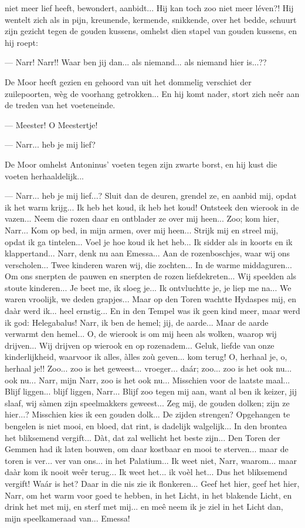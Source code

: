 \documentclass[a4paper, 12pt, oneside, dutch]{article}
\begin{document}
niet meer lief heeft, bewondert, aanbidt... Hij kan toch zoo niet meer léven?! Hij wentelt zich als in pijn, kreunende, kermende, snikkende, over het bedde, schuurt zijn gezicht tegen de gouden kussens, omhelst dien stapel van gouden kussens, en hij roept:

--- Narr! Narr!! Waar ben jij dan... als niemand... als niemand hier is...??

De Moor heeft gezien en gehoord van uit het dommelig verschiet der zuilepoorten, wèg de voorhang getrokken... En hij komt nader, stort zich neêr aan de treden van het voeteneinde.

--- Meester! O Meestertje!

--- Narr... heb je mij lief?

De Moor omhelst Antoninus' voeten tegen zijn zwarte borst, en hij kust die voeten herhaaldelijk...

--- Narr... heb je mij lief...? Sluit dan de deuren, grendel ze, en aanbid mij, opdat ik het warm krijg... Ik heb het koud, ik heb het koud! Ontsteek den wierook in de vazen... Neem die rozen daar en ontblader ze over mij heen... Zoo; kom hier, Narr... Kom op bed, in mijn armen, over mij heen... Strijk mij en streel mij, opdat ik ga tintelen... Voel je hoe koud ik het heb... Ik sidder als in koorts en ik klappertand... Narr, denk nu aan Emessa... Aan de rozenboschjes, waar wij ons verscholen... Twee kinderen waren wij, die zochten... In de warme middaguren... Om ons snerpten de pauwen en snerpten de rozen liefdekreten... Wij speelden als stoute kinderen... Je beet me, ik sloeg je... Ik ontvluchtte je, je liep me na... We waren vroolijk, we deden grapjes... Maar op den Toren wachtte Hydaspes mij, en daàr werd ik... heel ernstig... En in den Tempel was ik geen kind meer, maar werd ik god: Helegabalus! Narr, ik ben de hemel; jij, de aarde... Maar de aarde verwarmt den hemel... O, de wierook is om mij heen als wolken, waarop wij drijven... Wij drijven op wierook en op rozenadem... Geluk, liefde van onze kinderlijkheid, waarvoor ik alles, àlles zoù geven... kom terug! O, herhaal je, o, herhaal je!! Zoo... zoo is het geweest... vroeger... daár; zoo... zoo is het ook nu... ook nu... Narr, mijn Narr, zoo is het ook nu... Misschien voor de laatste maal... Blijf liggen... blijf liggen, Narr... Blijf zoo tegen mij aan, want al ben ik keizer, jij slaaf, wij sàmen zijn speelmakkers geweest... Zeg mij, de gouden dolken; zijn ze hier...? Misschien kies ik een gouden dolk... De zijden strengen? Opgehangen te bengelen is niet mooi, en bloed, dat rint, is dadelijk walgelijk... In den brontea het bliksemend vergift... Dàt, dat zal wellicht het beste zijn... Den Toren der Gemmen had ik laten bouwen, om daar kostbaar en mooi te sterven... maar de toren is ver... ver van ons... in het Palatium... Ik weet niet, Narr, waarom... maar daàr kom ik nooit weêr terug... Ik weet het... ik voèl het... Dus het bliksemend vergift! Waár is het? Daar in die nis zie ik flonkeren... Geef het hier, geef het hier, Narr, om het warm voor goed te hebben, in het Licht, in het blakende Licht, en drink het met mij, en sterf met mij... en meê neem ik je ziel in het Licht dan, mijn speelkameraad van... Emessa!
\end{document}
